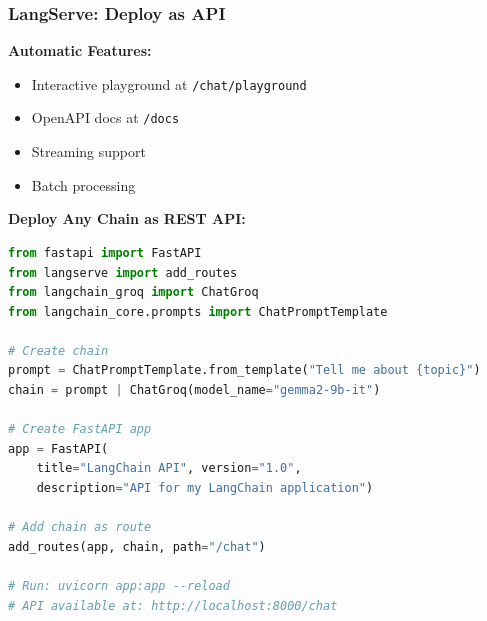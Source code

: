 \begin{frame}[fragile]\frametitle{LangServe: Deploy as API}
\textbf{Automatic Features:}
\begin{itemize}
\item Interactive playground at \texttt{/chat/playground}
\item OpenAPI docs at \texttt{/docs}
\item Streaming support
\item Batch processing
\end{itemize}

\textbf{Deploy Any Chain as REST API:}
\begin{lstlisting}[language=python, basicstyle=\tiny]
from fastapi import FastAPI
from langserve import add_routes
from langchain_groq import ChatGroq
from langchain_core.prompts import ChatPromptTemplate

# Create chain
prompt = ChatPromptTemplate.from_template("Tell me about {topic}")
chain = prompt | ChatGroq(model_name="gemma2-9b-it")

# Create FastAPI app
app = FastAPI(
    title="LangChain API", version="1.0",
    description="API for my LangChain application")

# Add chain as route
add_routes(app, chain, path="/chat")

# Run: uvicorn app:app --reload
# API available at: http://localhost:8000/chat
\end{lstlisting}

\end{frame}

